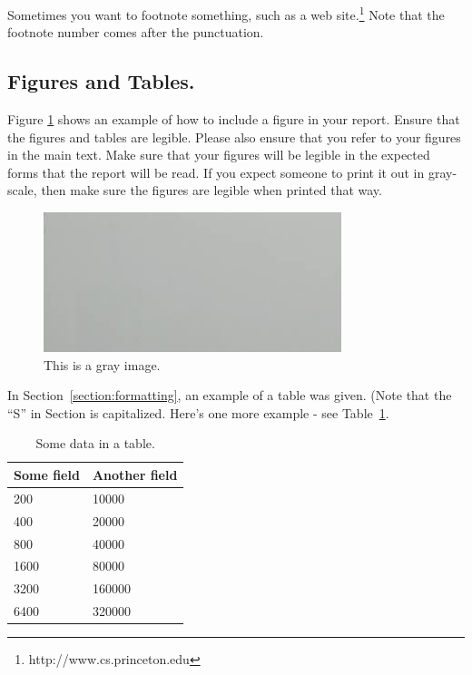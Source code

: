\documentclass[pageno]{jpaper}
\begin{document}
Sometimes you want to footnote something, such as a web
site.\footnote{http://www.cs.princeton.edu}  Note that the footnote
number comes after the punctuation.

\subsection{Figures and Tables.}

Figure \ref{fig:gray} shows an example of how to include a figure in
your report.  
Ensure that the figures and
tables are legible.  Please also ensure that you refer to your
figures in the main text. Make sure that your figures will be legible
in the expected forms that the report will be read.  If you expect someone
to print it out in gray-scale, then make sure the figures are legible 
when printed that way.  

\begin{figure}[hbt]
	\centering
	\includegraphics[width=0.75\linewidth]{gray.jpg}
	\caption{This is a gray image.}
	\label{fig:gray}
\end{figure}

In Section~\ref{section:formatting}, an example of a table was given.
(Note that the ``S'' in Section is capitalized.  Here's one more
example - see Table~\ref{table:data}.

\begin{table}[hbt]
	\centering
	\begin{tabular}{|l|l|} \hline
		\textbf{Some field} & \textbf{Another field}\\\hline
		200          &  10000 \\ \hline 
		400          &  20000 \\ \hline 
		800          &  40000 \\ \hline 
		1600        &  80000 \\ \hline 
		3200        &  160000 \\ \hline 
		6400        &  320000 \\ \hline 
	\end{tabular}
	\caption{Some data in a table. }
	\label{table:data}
\end{table}
\end{document}
